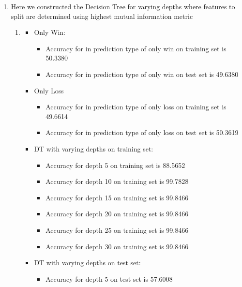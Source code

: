 \begin{enumerate}[label=(\alph*)]
  
    \item Here we constructed the Decision Tree for varying depths where features to split are determined using highest mutual information metric
    \begin{enumerate}[label=\roman*.]
        \item 
            \begin{itemize}
                \item Only Win:
                \begin{itemize}
                    \item Accuracy for in prediction type of only win on training set is 50.3380
                    \item Accuracy for in prediction type of only win on test set is 49.6380
                \end{itemize}
                \item Only Loss
                \begin{itemize}
                    \item Accuracy for in prediction type of only loss on training set is 49.6614
                    \item Accuracy for in prediction type of only loss on test set is 50.3619
                \end{itemize}
                \item DT with varying depths on training set:
                \begin{itemize}
                    \item Accuracy for depth 5 on training set is 88.5652
                    \item Accuracy for depth 10 on training set is 99.7828
                    \item Accuracy for depth 15 on training set is 99.8466
                    \item Accuracy for depth 20 on training set is 99.8466
                    \item Accuracy for depth 25 on training set is 99.8466
                    \item Accuracy for depth 30 on training set is 99.8466
                \end{itemize}
                \item DT with varying depths on test set:
                \begin{itemize}
                    \item Accuracy for depth 5 on test set is 57.6008

\end{itemize}
\end{itemize}
\end{enumerate}
\end{enumerate}
